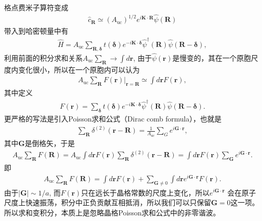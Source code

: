 \documentclass[10pt, oneside]{article}
\begin{document}
格点费米子算符变成
\begin{align}
	\boxed{
		\hat{c}_{\bm{R}} \simeq \left(A_{\mathrm{uc}}\right)^{1/2}  e^{i \bm{K} \cdot \bm{R}} \hat{\psi}\left(\bm{R}\right)
	}
\end{align}
带入到哈密顿量中有
\begin{align}
	\hat{H} = A_{\mathrm{uc}} \sum_{\bm{R}, \bm{\delta}} t \left(\bm{\delta}\right) e^{ - i \bm{K} \cdot \bm{\delta}} \hat{\psi}^{\dagger} \left(\bm{R}\right) \hat{\psi} \left(\bm{R} - \bm{\delta}\right),
\end{align}
利用前面的积分求和关系\(A_{\mathrm{uc}} \sum_{\bm{R}} \rightarrow \int d \bm{r}\), 由于\(\hat{\psi}\left(\bm{r}\right)\)是慢变的，其在一个原胞尺度内变化很小，所以在一个原胞内可以认为
\begin{align}
	A_{\mathrm{uc}} \sum_{\bm{R}} F \left(\bm{r}\right) \bigg|_{\bm{r} = \bm{R}} \simeq \int d \bm{r} F \left(\bm{r}\right),
\end{align}
其中定义
\begin{align}
	F \left(\bm{r}\right) = \sum_{\bm{\delta}} t \left(\bm{\delta}\right) e^{ - i \bm{K} \cdot \bm{\delta}} \hat{\psi}^{\dagger} \left(\bm{R}\right) \hat{\psi} \left(\bm{R} - \bm{\delta}\right).
\end{align}
更严格的写法是引入Poisson求和公式（Dirac comb formula），也就是
\begin{align}
	\boxed{
		\sum_{\bm{R}}  \delta^{\left(2\right)} \left(\bm{r} - \bm{R}\right) = \frac{1}{A_{\mathrm{uc}}} \sum_{G} e^{i \bm{G} \cdot \bm{r}}
	},
\end{align}
其中\(\bm{G}\)是倒格矢，于是
\begin{align}
	A_{\mathrm{uc}} \sum_{\bm{R}} F \left(\bm{R}\right) = A_{\mathrm{uc}} \int d \bm{r} F \left(\bm{r}\right) \sum_{\bm{R}} \delta^{\left(2\right)} \left(\bm{r} - \bm{R}\right) = \int d \bm{r} F \left(\bm{r}\right) \sum_{\bm{G}} e^{i \bm{G} \cdot \bm{r}}.
\end{align}
即
\begin{align}
	A_{\mathrm{uc}} \sum_{\bm{R}} F \left(\bm{R}\right) = \int d \bm{r} F \left(\bm{r}\right) + \sum_{\bm{G} \neq 0} \int d \bm{r} e^{i \bm{G} \cdot \bm{r}} F \left(\bm{r}\right).
\end{align}
由于\(\left|\bm{G}\right| \sim 1/a\), 而\(F \left(\bm{r}\right)\)只在远长于晶格常数的尺度上变化，所以\(e^{i \bm{G} \cdot \bm{r}}\) 会在原子尺度上快速振荡，积分中正负贡献互相抵消，所以我们可以只保留\(\bm{G} = 0\)这一项。所以求和变积分，本质上是忽略晶格Poisson求和公式中的非零谐波。
\end{document}
